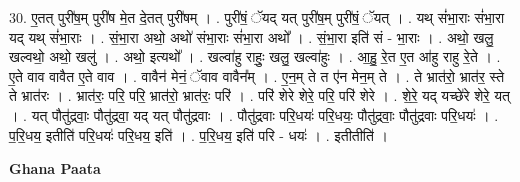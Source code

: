 \documentclass[17pt]{extarticle}
\begin{document}
30. ए॒तत् पुरी॑ष॒म् पुरी॑ष मे॒त दे॒तत् पुरी॑षम् । . पुरी॑षं॒ ॅयद् यत् पुरी॑ष॒म् पुरी॑षं॒ ॅयत् । . यथ् सं॑भा॒राः सं॑भा॒रा यद् यथ् सं॑भा॒राः । . सं॒भा॒रा अथो॒ अथो॑ संभा॒राः सं॑भा॒रा अथो᳚ । . सं॒भा॒रा इति॑ सं - भा॒राः । . अथो॒ खलु॒ खल्वथो॒ अथो॒ खलु॑ । . अथो॒ इत्यथो᳚ । . खल्वा॑हु राहुः॒ खलु॒ खल्वा॑हुः । . आ॒हु॒ रे॒त ए॒त आ॑हु राहु रे॒ते । . ए॒ते वाव वावैत ए॒ते वाव । . वावैन॑ मेनं॒ ॅवाव वावैन᳚म् । . ए॒न॒म् ते त ए॑न मेन॒म् ते । . ते भ्रात॑रो॒ भ्रात॑र॒ स्ते ते भ्रात॑रः । . भ्रात॑रः॒ परि॒ परि॒ भ्रात॑रो॒ भ्रात॑रः॒ परि॑ । . परि॑ शेरे शेरे॒ परि॒ परि॑ शेरे । . शे॒रे॒ यद् यच्छे॑रे शेरे॒ यत् । . यत् पौतु॑द्रवाः॒ पौतु॑द्रवा॒ यद् यत् पौतु॑द्रवाः । . पौतु॑द्रवाः परि॒धयः॑ परि॒धयः॒ पौतु॑द्रवाः॒ पौतु॑द्रवाः परि॒धयः॑ । . प॒रि॒धय॒ इतीति॑ परि॒धयः॑ परि॒धय॒ इति॑ । . प॒रि॒धय॒ इति॑ परि - धयः॑ । . इतीतीति॑ । \newline

\textbf{Ghana Paata } \newline
\end{document}
